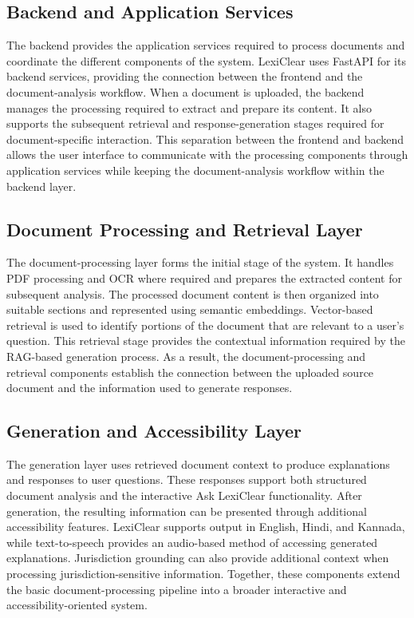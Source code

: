 \documentclass[12pt,a4paper,oneside]{report}
\begin{document}
\subsection{Backend and Application Services}

The backend provides the application services required to process documents
and coordinate the different components of the system. LexiClear uses
FastAPI for its backend services, providing the connection between the
frontend and the document-analysis workflow. When a document is uploaded,
the backend manages the processing required to extract and prepare its
content. It also supports the subsequent retrieval and response-generation
stages required for document-specific interaction. This separation between
the frontend and backend allows the user interface to communicate with the
processing components through application services while keeping the
document-analysis workflow within the backend layer.

\subsection{Document Processing and Retrieval Layer}

The document-processing layer forms the initial stage of the system. It
handles PDF processing and OCR where required and prepares the extracted
content for subsequent analysis. The processed document content is then
organized into suitable sections and represented using semantic embeddings.
Vector-based retrieval is used to identify portions of the document that are
relevant to a user's question. This retrieval stage provides the contextual
information required by the RAG-based generation process. As a result, the
document-processing and retrieval components establish the connection between
the uploaded source document and the information used to generate responses.

\subsection{Generation and Accessibility Layer}

The generation layer uses retrieved document context to produce explanations
and responses to user questions. These responses support both structured
document analysis and the interactive Ask LexiClear functionality. After
generation, the resulting information can be presented through additional
accessibility features. LexiClear supports output in English, Hindi, and
Kannada, while text-to-speech provides an audio-based method of accessing
generated explanations. Jurisdiction grounding can also provide additional
context when processing jurisdiction-sensitive information. Together, these
components extend the basic document-processing pipeline into a broader
interactive and accessibility-oriented system.
\end{document}
